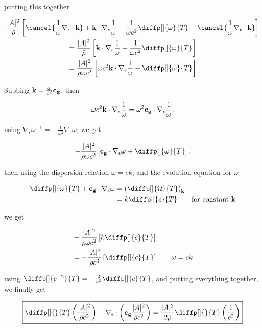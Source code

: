putting this together

\begin{gather*}
  \frac{|A|^2}{\bar \rho } \left[\cancel{\frac{1}{\omega } \nabla _{\epsilon }\cdot {\bf k}} + {\bf k} \cdot \nabla
  _{\epsilon } \frac{1}{\omega } - \frac{1}{\omega c^2} \diffp[]{\omega }{T}
- \cancel{\frac{1}{\omega }\nabla _{\epsilon }\cdot {\bf k}} \right] \\
   = \frac{|A|^2}{\bar \rho } \left[{\bf k} \cdot \nabla
  _{\epsilon } \frac{1}{\omega } - \frac{1}{\omega c^2} \diffp[]{\omega }{T}
\right] \\
   = \frac{|A|^2}{\bar \rho \omega c^2 } \left[ \omega c^2{\bf k} \cdot \nabla
  _{\epsilon } \frac{1}{\omega } -  \diffp[]{\omega }{T}
\right] \\
\end{gather*}

Subbing ${\bf k} = \frac{\omega}{c^2}{\bf c_{g}}$, then

\[
\omega c^2{\bf k} \cdot \nabla
  _{\epsilon } \frac{1}{\omega } = \omega ^2 {\bf c_{g}} \cdot \nabla
  _{\epsilon } \frac{1}{\omega }
.\] 

using $\nabla _{\epsilon } \omega ^{-1} = -\frac{1}{\omega^2 } \nabla
_{\epsilon } \omega $, we get

\[
  -\frac{|A|^2}{\bar \rho \omega c^2 } \left[ {\bf c_{g}} \cdot \nabla
  _{\epsilon } \omega  +  \diffp[]{\omega }{T} \right]
.\] 

then using the dispersion relation $\omega = ck$, and the evolution equation
for $\omega $

\begin{align*}
  \diffp[]{\omega }{T} + {\bf c_{g}} \cdot \nabla
  _{\epsilon } \omega &= \left( \diffp[]{\Omega}{T} \right)_{{\bf k}} \\
                      &= k \diffp[]{c}{T} \qquad \text{for constant {\bf k}}
\end{align*}

we get

\begin{align*}
  &-\frac{|A|^2}{\bar \rho \omega c^2 } \left[k \diffp[]{c}{T} \right] \\
  &= -\frac{|A|^2}{\bar \rho c^3 } \left[ \diffp[]{c}{T} \right] \qquad  \omega = ck
\end{align*}

using $\diffp[]{c^{-2}}{T} = -\frac{2}{c^{3}} \diffp[]{c}{T}$, and putting
everything together, we finally get

\begin{equation}
  \boxed{\diffp[]{}{T} \left( \frac{|A|^2}{\bar \rho c^2}\right) + \nabla _{\epsilon
  } \cdot \left( {\bf c_{g}} \frac{|A|^2}{\bar \rho c^2}\right)
  = \frac{|A|^2}{2 \bar \rho } \diffp[]{}{T} \left( \frac{1}{c^2} \right)}
\end{equation}

